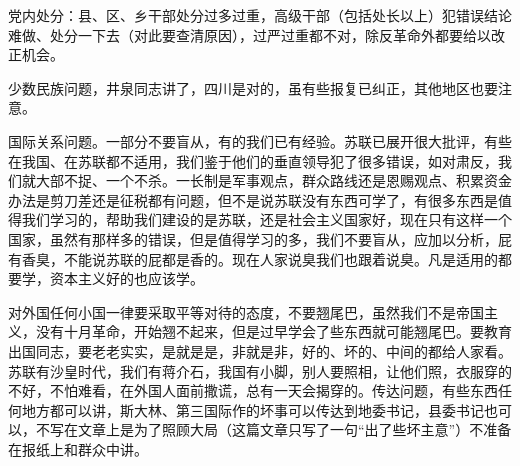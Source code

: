 党内处分：县、区、乡干部处分过多过重，高级干部（包括处长以上）犯错误结论难做、处分一下去（对此要查清原因），过严过重都不对，除反革命外都要给以改正机会。

少数民族问题，井泉同志讲了，四川是对的，虽有些报复已纠正，其他地区也要注意。

国际关系问题。一部分不要盲从，有的我们已有经验。苏联已展开很大批评，有些在我国、在苏联都不适用，我们鉴于他们的垂直领导犯了很多错误，如对肃反，我们就大部不捉、一个不杀。一长制是军事观点，群众路线还是恩赐观点、积累资金办法是剪刀差还是征税都有问题，但不是说苏联没有东西可学了，有很多东西是值得我们学习的，帮助我们建设的是苏联，还是社会主义国家好，现在只有这样一个国家，虽然有那样多的错误，但是值得学习的多，我们不要盲从，应加以分析，屁有香臭，不能说苏联的屁都是香的。现在人家说臭我们也跟着说臭。凡是适用的都要学，资本主义好的也应该学。

对外国任何小国一律要采取平等对待的态度，不要翘尾巴，虽然我们不是帝国主义，没有十月革命，开始翘不起来，但是过早学会了些东西就可能翘尾巴。要教育出国同志，要老老实实，是就是是，非就是非，好的、坏的、中间的都给人家看。苏联有沙皇时代，我们有蒋介石，我国有小脚，别人要照相，让他们照，衣服穿的不好，不怕难看，在外国人面前撒谎，总有一天会揭穿的。传达问题，有些东西任何地方都可以讲，斯大林、第三国际作的坏事可以传达到地委书记，县委书记也可以，不写在文章上是为了照顾大局（这篇文章只写了一句“出了些坏主意”）不准备在报纸上和群众中讲。


